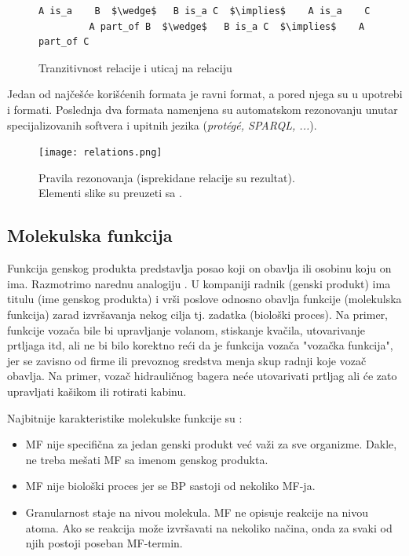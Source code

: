\begin{figure}[h!]
  \centering
\begin{lstlisting}[basicstyle=\normalfont]
         A is_a    B  $\wedge$   B is_a C  $\implies$    A is_a    C           
         A part_of B  $\wedge$   B is_a C  $\implies$    A part_of C
\end{lstlisting}
\caption{Tranzitivnost relacije  i uticaj na relaciju }
  \label{fig:is_a}
\end{figure}


Jedan od najčešće korišćenih formata je  ravni  format, a pored njega
su u upotrebi  i  formati.  Poslednja dva formata
namenjena su automatskom rezonovanju unutar specijalizovanih softvera i upitnih
jezika (\textit{protégé, SPARQL, ...}).

\begin{figure}[h!]
  \centering
  \texttt{[image: relations.png]}
  \caption{Pravila rezonovanja (isprekidane relacije su rezultat). \\ Elementi slike su preuzeti sa \parencite{go_veb}.}
  \label{fig:relations}
\end{figure}


\subsection{Molekulska funkcija}
\label{MF}

Funkcija genskog produkta predstavlja posao koji on obavlja ili osobinu koju on ima.
Razmotrimo narednu analogiju \parencite{go_mf}.  U kompaniji radnik (genski produkt) ima titulu
(ime genskog produkta) i vrši poslove odnosno obavlja funkcije (molekulska
funkcija) zarad izvršavanja nekog cilja tj. zadatka (biološki proces). Na
primer, funkcije vozača bile bi upravljanje volanom, stiskanje kvačila,
utovarivanje prtljaga itd, ali ne bi bilo korektno reći da je funkcija vozača
"vozačka funkcija", jer se zavisno od firme ili prevoznog sredstva menja skup
radnji koje vozač obavlja. Na primer, vozač hidrauličnog bagera neće
utovarivati prtljag ali će zato upravljati kašikom ili rotirati kabinu.

Najbitnije karakteristike molekulske funkcije su \parencite{go_mf}:
\begin{itemize}
  \item MF nije specifična za jedan genski produkt već važi za sve organizme. Dakle, ne treba mešati MF sa imenom genskog produkta.
  \item MF nije biološki proces jer se BP sastoji od nekoliko MF-ja.
  \item Granularnost staje na nivou molekula. MF ne opisuje reakcije na nivou
    atoma. Ako se reakcija može izvršavati na nekoliko načina, onda za svaki od njih
    postoji poseban MF-termin.
\end{itemize}

